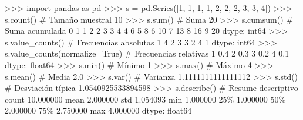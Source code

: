 \documentclass[
  spanish,
  a4paper,
]{scrreport}
\newenvironment{Shaded}{\begin{snugshade}}{\end{snugshade}}
\newcommand{\BuiltInTok}[1]{\textcolor[rgb]{0.00,0.23,0.31}{#1}}
\newcommand{\CommentTok}[1]{\textcolor[rgb]{0.37,0.37,0.37}{#1}}
\newcommand{\DecValTok}[1]{\textcolor[rgb]{0.68,0.00,0.00}{#1}}
\newcommand{\FloatTok}[1]{\textcolor[rgb]{0.68,0.00,0.00}{#1}}
\newcommand{\ImportTok}[1]{\textcolor[rgb]{0.00,0.46,0.62}{#1}}
\newcommand{\NormalTok}[1]{\textcolor[rgb]{0.00,0.23,0.31}{#1}}
\newcommand{\OperatorTok}[1]{\textcolor[rgb]{0.37,0.37,0.37}{#1}}
\newcommand{\VariableTok}[1]{\textcolor[rgb]{0.07,0.07,0.07}{#1}}
\begin{document}
\begin{Shaded}
\begin{Highlighting}[]
\OperatorTok{\textgreater{}\textgreater{}\textgreater{}} \ImportTok{import}\NormalTok{ pandas }\ImportTok{as}\NormalTok{ pd}
\OperatorTok{\textgreater{}\textgreater{}\textgreater{}}\NormalTok{ s }\OperatorTok{=}\NormalTok{ pd.Series([}\DecValTok{1}\NormalTok{, }\DecValTok{1}\NormalTok{, }\DecValTok{1}\NormalTok{, }\DecValTok{1}\NormalTok{, }\DecValTok{2}\NormalTok{, }\DecValTok{2}\NormalTok{, }\DecValTok{2}\NormalTok{, }\DecValTok{3}\NormalTok{, }\DecValTok{3}\NormalTok{, }\DecValTok{4}\NormalTok{])}
\OperatorTok{\textgreater{}\textgreater{}\textgreater{}}\NormalTok{ s.count()  }\CommentTok{\# Tamaño muestral}
\DecValTok{10}
\OperatorTok{\textgreater{}\textgreater{}\textgreater{}}\NormalTok{ s.}\BuiltInTok{sum}\NormalTok{()  }\CommentTok{\# Suma}
\DecValTok{20}
\OperatorTok{\textgreater{}\textgreater{}\textgreater{}}\NormalTok{ s.cumsum()  }\CommentTok{\# Suma acumulada}
\DecValTok{0}     \DecValTok{1}
\DecValTok{1}     \DecValTok{2}
\DecValTok{2}     \DecValTok{3}
\DecValTok{3}     \DecValTok{4}
\DecValTok{4}     \DecValTok{6}
\DecValTok{5}     \DecValTok{8}
\DecValTok{6}    \DecValTok{10}
\DecValTok{7}    \DecValTok{13}
\DecValTok{8}    \DecValTok{16}
\DecValTok{9}    \DecValTok{20}
\NormalTok{dtype: int64}
\OperatorTok{\textgreater{}\textgreater{}\textgreater{}}\NormalTok{ s.value\_counts()  }\CommentTok{\# Frecuencias absolutas}
\DecValTok{1}    \DecValTok{4}
\DecValTok{2}    \DecValTok{3}
\DecValTok{3}    \DecValTok{2}
\DecValTok{4}    \DecValTok{1}
\NormalTok{dtype: int64}
\OperatorTok{\textgreater{}\textgreater{}\textgreater{}}\NormalTok{ s.value\_counts(normalize}\OperatorTok{=}\VariableTok{True}\NormalTok{)  }\CommentTok{\# Frecuencias relativas}
\DecValTok{1}    \FloatTok{0.4}
\DecValTok{2}    \FloatTok{0.3}
\DecValTok{3}    \FloatTok{0.2}
\DecValTok{4}    \FloatTok{0.1}
\NormalTok{dtype: float64}
\OperatorTok{\textgreater{}\textgreater{}\textgreater{}}\NormalTok{ s.}\BuiltInTok{min}\NormalTok{()  }\CommentTok{\# Mínimo}
\DecValTok{1}
\OperatorTok{\textgreater{}\textgreater{}\textgreater{}}\NormalTok{ s.}\BuiltInTok{max}\NormalTok{()  }\CommentTok{\# Máximo}
\DecValTok{4}
\OperatorTok{\textgreater{}\textgreater{}\textgreater{}}\NormalTok{ s.mean()  }\CommentTok{\# Media}
\FloatTok{2.0}
\OperatorTok{\textgreater{}\textgreater{}\textgreater{}}\NormalTok{ s.var()  }\CommentTok{\# Varianza}
\FloatTok{1.1111111111111112}
\OperatorTok{\textgreater{}\textgreater{}\textgreater{}}\NormalTok{ s.std()  }\CommentTok{\# Desviación típica}
\FloatTok{1.0540925533894598}
\OperatorTok{\textgreater{}\textgreater{}\textgreater{}}\NormalTok{ s.describe()  }\CommentTok{\# Resume descriptivo}
\NormalTok{count    }\FloatTok{10.000000}
\NormalTok{mean      }\FloatTok{2.000000}
\NormalTok{std       }\FloatTok{1.054093}
\BuiltInTok{min}       \FloatTok{1.000000}
\DecValTok{25}\OperatorTok{\%}       \FloatTok{1.000000}
\DecValTok{50}\OperatorTok{\%}       \FloatTok{2.000000}
\DecValTok{75}\OperatorTok{\%}       \FloatTok{2.750000}
\BuiltInTok{max}       \FloatTok{4.000000}
\NormalTok{dtype: float64}
\end{Highlighting}
\end{Shaded}
\end{document}
